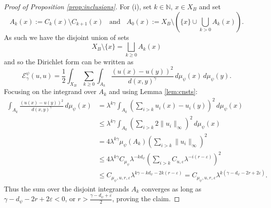 \documentclass[12pt]{amsart}
\theoremstyle{plain}
\theoremstyle{definition}
\begin{document}
\begin{proof}[Proof of Proposition \ref{prop:inclusions}]
    For (i), set $k\in\mathbb{N}$, $x\in X_B$ and set 
    \begin{equation}
    \label{eqn:anuli}
    A_k(x) := C_k(x)\setminus C_{k+1}(x)\;\; \mbox{ and }\;\; A_0(x) := X_B\setminus\left( \{x\} \cup \bigcup_{k>0} A_k(x)\right).
    \end{equation}
    As such we have the disjoint union of sets
    $$X_B\setminus \{x\} =  \bigsqcup_{k\geq0 } A_k(x)$$
    and so the Dirichlet form can be written as
    $$\mathcal{E}^\psi _\gamma(u,u) = \frac12 \int_{X_B} \sum_{k\geq 0} \int_{A_k}\frac{(u(x)-u(y))^2}{d(x,y)^\gamma}\, d\mu_\psi(x)\, d\mu_\psi(y).$$
    Focusing on the integrand over $A_k$ and using Lemma \ref{lem:cnsts}:
    \begin{align*}
        \int_{A_k}\frac{(u(x)-u(y))^2}{d(x,y)^\gamma}\, d\mu_\psi(x)&  = \lambda^{k\gamma}\int_{A_k}\left(\sum_{i>k}u_i(x)-u_i(y)\right)^2\, d\mu_\psi(x) \\
        &\leq \lambda^{k\gamma}\int_{A_k}\left(\sum_{i>k}2\|u_i\|_\infty\right)^2\, d\mu_\psi(x) \\
        &= 4\lambda^{k\gamma}\mu_\psi(A_k)\left(\sum_{i>k}\|u_i\|_\infty\right)^2 \\
        &\leq 4\lambda^{k\gamma}C_{\mu_\psi} \lambda^{-kd_\psi}\left(\sum_{i>k}C_{u,\varepsilon}\lambda^{-i(r-\varepsilon)}\right)^2 \\
        & \leq C_{\mu_\psi,u,r, \varepsilon}\lambda^{k\gamma-kd_\psi -2k(r-\varepsilon)} = C_{\mu_\psi,u,r, \varepsilon}\lambda^{k(\gamma-d_\psi -2r+2\varepsilon)}.
    \end{align*}
    Thus the sum over the disjoint integrands $A_k$ converges as long as $\gamma-d_\psi-2r+2\varepsilon<0$, or $r>\frac{\gamma-d_\psi+\varepsilon}{2}$, proving the claim.


\end{proof}
\end{document}
